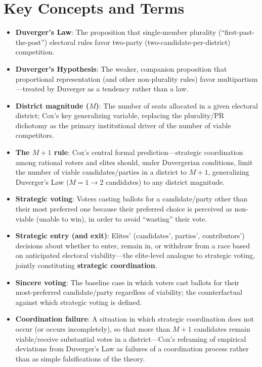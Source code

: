 \documentclass[12pt]{article}
\begin{document}
\section{Key Concepts and Terms}

\begin{itemize}[leftmargin=*, itemsep=4pt]
    \item \textbf{Duverger's Law}: The proposition that single-member plurality (``first-past-the-post'') electoral rules favor two-party (two-candidate-per-district) competition.
    \item \textbf{Duverger's Hypothesis}: The weaker, companion proposition that proportional representation (and other non-plurality rules) favor multipartism---treated by Duverger as a tendency rather than a law.
    \item \textbf{District magnitude ($M$)}: The number of seats allocated in a given electoral district; Cox's key generalizing variable, replacing the plurality/PR dichotomy as the primary institutional driver of the number of viable competitors.
    \item \textbf{The $M+1$ rule}: Cox's central formal prediction---strategic coordination among rational voters and elites should, under Duvergerian conditions, limit the number of viable candidates/parties in a district to $M+1$, generalizing Duverger's Law ($M=1 \to 2$ candidates) to any district magnitude.
    \item \textbf{Strategic voting}: Voters casting ballots for a candidate/party other than their most preferred one because their preferred choice is perceived as non-viable (unable to win), in order to avoid ``wasting'' their vote.
    \item \textbf{Strategic entry (and exit)}: Elites' (candidates', parties', contributors') decisions about whether to enter, remain in, or withdraw from a race based on anticipated electoral viability---the elite-level analogue to strategic voting, jointly constituting \textbf{strategic coordination}.
    \item \textbf{Sincere voting}: The baseline case in which voters cast ballots for their most-preferred candidate/party regardless of viability; the counterfactual against which strategic voting is defined.
    \item \textbf{Coordination failure}: A situation in which strategic coordination does not occur (or occurs incompletely), so that more than $M+1$ candidates remain viable/receive substantial votes in a district---Cox's reframing of empirical deviations from Duverger's Law as failures of a coordination process rather than as simple falsifications of the theory.

\end{itemize}
\end{document}
